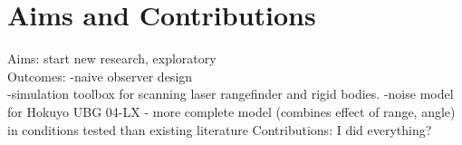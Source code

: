 \chapter*{Aims and Contributions}

Aims: start new research, exploratory\\
Outcomes:
-naive observer design\\
-simulation toolbox for scanning laser rangefinder and rigid bodies.
-noise model for Hokuyo UBG 04-LX - more complete model (combines effect of range, angle) in conditions tested than existing literature
Contributions: I did everything?